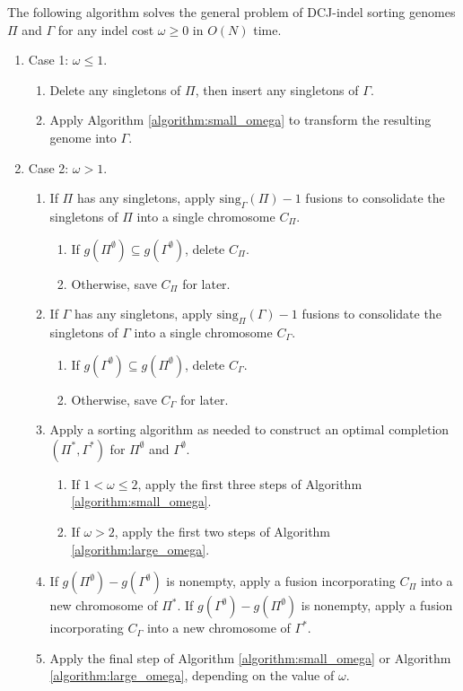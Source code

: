 \begin{algorithm} The following algorithm solves the general problem of DCJ-indel sorting genomes $\Pi$ and $\Gamma$ for any indel cost $\omega \geq 0$ in $O(N)$ time.
\begin{enumerate}
\item Case 1: $\omega \leq 1$.
\begin{enumerate}
\item Delete any singletons of $\Pi$, then insert any singletons of $\Gamma$.
\item Apply Algorithm \ref{algorithm:small_omega} to transform the resulting genome into $\Gamma$.
\end{enumerate}
\item Case 2: $\omega > 1$.
\begin{enumerate}
\item If $\Pi$ has any singletons, apply $\mathrm{sing}_{\Gamma}(\Pi) - 1$ fusions to consolidate the singletons of $\Pi$ into a single chromosome $C_{\Pi}$.
\begin{enumerate}
\item If $g(\Pi^{\emptyset}) \subseteq g(\Gamma^{\emptyset})$, delete $C_{\Pi}$.
\item Otherwise, save $C_{\Pi}$ for later.
\end{enumerate}
\item If $\Gamma$ has any singletons, apply $\mathrm{sing}_{\Pi}(\Gamma) - 1$ fusions to consolidate the singletons of $\Gamma$ into a single chromosome $C_{\Gamma}$.
\begin{enumerate}
\item If $g(\Gamma^{\emptyset}) \subseteq g(\Pi^{\emptyset})$, delete $C_{\Gamma}$.
\item Otherwise, save $C_{\Gamma}$ for later.
\end{enumerate}
\item Apply a sorting algorithm as needed to construct an optimal completion $(\Pi^{*}, \Gamma^{*})$ for $\Pi^{\emptyset}$ and $\Gamma^{\emptyset}$.
\begin{enumerate}
\item If $1 < \omega \leq 2$, apply the first three steps of Algorithm \ref{algorithm:small_omega}.
\item If $\omega > 2$, apply the first two steps of Algorithm \ref{algorithm:large_omega}.
\end{enumerate}
\item If $g(\Pi^{\emptyset}) - g(\Gamma^{\emptyset})$ is nonempty, apply a fusion incorporating $C_{\Pi}$ into a new chromosome of $\Pi^{*}$.  If $g(\Gamma^{\emptyset}) - g(\Pi^{\emptyset})$ is nonempty, apply a fusion incorporating $C_{\Gamma}$ into a new chromosome of $\Gamma^{*}$.
\item Apply the final step of Algorithm \ref{algorithm:small_omega} or Algorithm \ref{algorithm:large_omega}, depending on the value of $\omega$.
\end{enumerate}
\end{enumerate}
\vspace{-\baselineskip}

\label{algorithm:unified_cost}
\end{algorithm}

